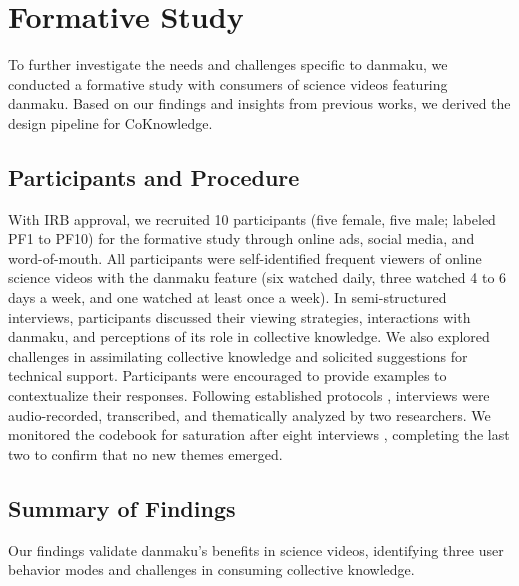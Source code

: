 \section{Formative Study}
\label{formative-study}
To further investigate the needs and challenges specific to danmaku, we conducted a formative study with consumers of science videos featuring danmaku. Based on our findings and insights from previous works, we derived the design pipeline for CoKnowledge.

\subsection{Participants and Procedure}
With IRB approval, we recruited 10 participants (five female, five male; labeled PF1 to PF10) for the formative study through online ads, social media, and word-of-mouth. All participants were self-identified frequent viewers of online science videos with the danmaku feature (six watched daily, three watched 4 to 6 days a week, and one watched at least once a week).  In semi-structured interviews, participants discussed their viewing strategies, interactions with danmaku, and perceptions of its role in collective knowledge. We also explored challenges in assimilating collective knowledge and solicited suggestions for technical support. Participants were encouraged to provide examples to contextualize their responses. 
Following established protocols \cite{klein2017quality, baker2021avatar, liu2021makes}, interviews were audio-recorded, transcribed, and thematically analyzed by two researchers.
We monitored the codebook for saturation after eight interviews \cite{saunders2018saturation}, completing the last two to confirm that no new themes emerged.

\subsection{Summary of Findings}
Our findings validate danmaku's benefits in science videos, identifying three user behavior modes and challenges in consuming collective knowledge.

